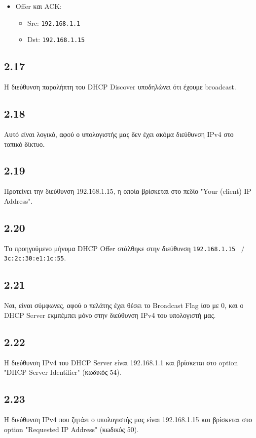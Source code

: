 			\begin{itemize}
				\item Offer και ACK:
				\begin{itemize}
					\item Src: \verb|192.168.1.1|
					\item Dst: \verb|192.168.1.15|
					
				\end{itemize}
			\end{itemize}

		\subsection*{2.17}
			Η διεύθυνση παραλήπτη του DHCP Discover υποδηλώνει ότι έχουμε broadcast.

		\subsection*{2.18}
			Αυτό είναι λογικό, αφού ο υπολογιστής μας δεν έχει ακόμα διεύθυνση IPv4 στο τοπικό δίκτυο.

		\subsection*{2.19}
			Προτείνει την διεύθυνση 192.168.1.15, η οποία βρίσκεται στο πεδίο "Your (client) IP Address".

		\subsection*{2.20}
			Το προηγούμενο μήνυμα DHCP Offer στάλθηκε στην διεύθυνση \verb|192.168.1.15| ~/~  \verb|3c:2c:30:e1:1c:55|.

		\subsection*{2.21}
			Ναι, είναι σύμφωνες, αφού ο πελάτης έχει θέσει το Broadcast Flag ίσο με 0, και ο DHCP Server εκμπέμπει μόνο στην διεύθυνση IPv4 του υπολογιστή μας.

		\subsection*{2.22}
			Η διεύθυνση IPv4 του DHCP Server είναι 192.168.1.1 και βρίσκεται στο option "DHCP Server Identifier" (κωδικός 54).

		\subsection*{2.23}
			Η διεύθυνση IPv4 που ζητάει ο υπολογιστής μας είναι 192.168.1.15 και βρίσκεται στο option "Requested IP Address" (κωδικός 50).

